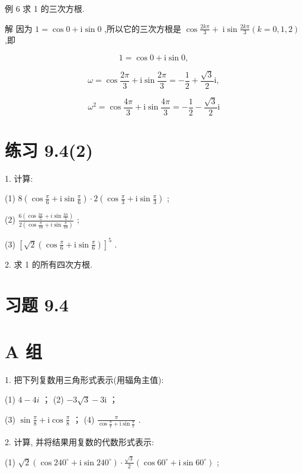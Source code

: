 \documentclass[10pt]{article}
\begin{document}
例 6 求 1 的三次方根.

解 因为 \(1 = \cos 0 + \mathrm{i}\sin 0\) ,所以它的三次方根是 \(\cos \frac{2k\pi }{3} + \; \mathrm{i}\sin \frac{2k\pi }{3}\left( {k = 0,1,2}\right)\) ,即

\[
1 = \cos 0 + \mathrm{i}\sin 0,
\]

\[
\omega  = \cos \frac{2\pi }{3} + \mathrm{i}\sin \frac{2\pi }{3} =  - \frac{1}{2} + \frac{\sqrt{3}}{2}\mathrm{i},
\]

\[
{\omega }^{2} = \cos \frac{4\pi }{3} + \mathrm{i}\sin \frac{4\pi }{3} =  - \frac{1}{2} - \frac{\sqrt{3}}{2}\mathrm{i}
\]

\section*{练习 9.4(2)}

1. 计算:

(1) \(8\left( {\cos \frac{\pi }{6} + \mathrm{i}\sin \frac{\pi }{6}}\right)  \cdot  2\left( {\cos \frac{\pi }{3} + \mathrm{i}\sin \frac{\pi }{3}}\right)\) ;

(2) \(\frac{6\left( {\cos \frac{3\pi }{5} + i\sin \frac{3\pi }{5}}\right) }{2\left( {\cos \frac{\pi }{10} + i\sin \frac{\pi }{10}}\right) }\) ;

(3) \({\left\lbrack  \sqrt{2}\left( \cos \frac{\pi }{6} + \mathrm{i}\sin \frac{\pi }{6}\right) \right\rbrack  }^{5}\) .

2. 求 1 的所有四次方根.

\section*{习题 9.4}

\section*{A 组}

1. 把下列复数用三角形式表示(用辐角主值):

(1) \(4 - {4i}\) ； (2) \(- 3\sqrt{3} - 3\mathrm{i}\) ；

(3) \(\sin \frac{\pi }{8} + \mathrm{i}\cos \frac{\pi }{8}\) ； (4) \(\frac{\pi }{\cos \frac{\pi }{7} + \mathrm{i}\sin \frac{\pi }{7}}\) .

2. 计算, 并将结果用复数的代数形式表示:

(1) \(\sqrt{2}\left( {\cos {240}^{ \circ  } + \mathrm{i}\sin {240}^{ \circ  }}\right)  \cdot  \frac{\sqrt{3}}{2}\left( {\cos {60}^{ \circ  } + \mathrm{i}\sin {60}^{ \circ  }}\right)\) ;
\end{document}
